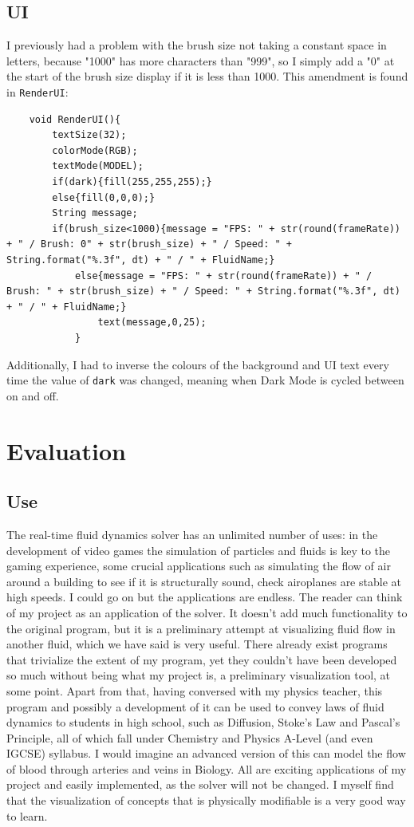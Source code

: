 \documentclass[12pt,a4paper]{book}
\begin{document}
\section{UI}
I previously had a problem with the brush size not taking a constant space in letters, because "1000" has more characters than "999", so I simply add a "0" at the start of the brush size display if it is less than 1000. This amendment is found in \verb|RenderUI|:
\begin{lstlisting}
	void RenderUI(){
		textSize(32);
		colorMode(RGB);
		textMode(MODEL);
		if(dark){fill(255,255,255);}
		else{fill(0,0,0);}
		String message;
		if(brush_size<1000){message = "FPS: " + str(round(frameRate)) + " / Brush: 0" + str(brush_size) + " / Speed: " + String.format("%.3f", dt) + " / " + FluidName;}
			else{message = "FPS: " + str(round(frameRate)) + " / Brush: " + str(brush_size) + " / Speed: " + String.format("%.3f", dt) + " / " + FluidName;}
				text(message,0,25);
			}
\end{lstlisting}
Additionally, I had to inverse the colours of the background and UI text every time the value of \verb|dark| was changed, meaning when Dark Mode is cycled between on and off.



\chapter{Evaluation}

\section{Use}
The real-time fluid dynamics solver has an unlimited number of uses: in the development of video games the simulation of particles and fluids is key to the gaming experience, some crucial applications such as simulating the flow of air around a building to see if it is structurally sound, check airoplanes are stable at high speeds. I could go on but the applications are endless. The reader can think of my project as an application of the solver. It doesn't add much functionality to the original program, but it is a preliminary attempt at visualizing fluid flow in another fluid, which we have said is very useful. There already exist programs that trivialize the extent of my program, yet they couldn't have been developed so much without being what my project is, a preliminary visualization tool, at some point. Apart from that, having conversed with my physics teacher, this program and possibly a development of it can be used to convey laws of fluid dynamics to students in high school, such as Diffusion, Stoke's Law and Pascal's Principle, all of which fall under Chemistry and Physics A-Level (and even IGCSE) syllabus. I would imagine an advanced version of this can model the flow of blood through arteries and veins in Biology. All are exciting applications of my project and easily implemented, as the solver will not be changed. I myself find that the visualization of concepts that is physically modifiable is a very good way to learn. 
\end{document}
